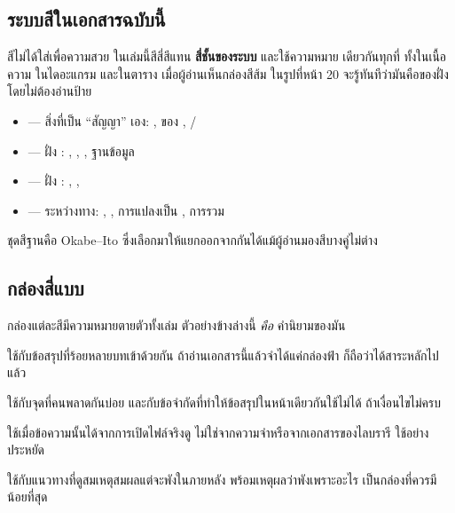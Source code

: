 \subsection*{ระบบสีในเอกสารฉบับนี้}

สีไม่ได้ใส่เพื่อความสวย ในเล่มนี้สีสี่สีแทน \textbf{สี่ชั้นของระบบ} และใช้ความหมาย
เดียวกันทุกที่ ทั้งในเนื้อความ ในไดอะแกรม และในตาราง เมื่อผู้อ่านเห็นกล่องสีส้ม
ในรูปที่หน้า 20 จะรู้ทันทีว่ามันคือของฝั่ง  โดยไม่ต้องอ่านป้าย

\begin{itemize}
\item \sctr{} --- สิ่งที่เป็น ``สัญญา'' เอง: ,  ของ , /
\item \sbe{} --- ฝั่ง : , , , ฐานข้อมูล
\item \sfe{} --- ฝั่ง : , ,  
\item \sops{} --- ระหว่างทาง: , , การแปลงเป็น , การรวม 
\end{itemize}

ชุดสีฐานคือ Okabe--Ito ซึ่งเลือกมาให้แยกออกจากกันได้แม้ผู้อ่านมองสีบางคู่ไม่ต่าง

\subsection*{กล่องสี่แบบ}

กล่องแต่ละสีมีความหมายตายตัวทั้งเล่ม ตัวอย่างข้างล่างนี้ \emph{คือ} คำนิยามของมัน

\begin{keybox}[title={ฟ้า --- ใจความที่ต้องจำติดตัวไป}]
ใช้กับข้อสรุปที่ร้อยหลายบทเข้าด้วยกัน ถ้าอ่านเอกสารนี้แล้วจำได้แค่กล่องฟ้า
ก็ถือว่าได้สาระหลักไปแล้ว
\end{keybox}

\begin{warnbox}[title={ส้ม --- กับดัก หรือข้อสมมติที่ถ้าลืมแล้วข้อสรุปจะผิด}]
ใช้กับจุดที่คนพลาดกันบ่อย และกับข้อจำกัดที่ทำให้ข้อสรุปในหน้าเดียวกันใช้ไม่ได้
ถ้าเงื่อนไขไม่ครบ
\end{warnbox}

\begin{goodbox}[title={เขียว --- ตรวจสอบกับของจริงในรีโปแล้ว}]
ใช้เมื่อข้อความนั้นได้จากการเปิดไฟล์จริงดู ไม่ใช่จากความจำหรือจากเอกสารของไลบรารี
ใช้อย่างประหยัด
\end{goodbox}

\begin{badbox}[title={แดง --- วิธีที่ผิดจริง ๆ}]
ใช้กับแนวทางที่ดูสมเหตุสมผลแต่จะพังในภายหลัง พร้อมเหตุผลว่าพังเพราะอะไร
เป็นกล่องที่ควรมีน้อยที่สุด
\end{badbox}



